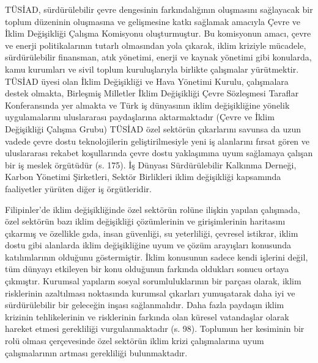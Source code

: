 \documentclass[
]{book}
\begin{document}
TÜSİAD, sürdürülebilir çevre dengesinin farkındalığının oluşmasını sağlayacak bir toplum düzeninin oluşmasına ve gelişmesine katkı sağlamak amacıyla Çevre ve İklim Değişikliği Çalışma Komisyonu oluşturmuştur. Bu komisyonun amacı, çevre ve enerji politikalarının tutarlı olmasından yola çıkarak, iklim kriziyle mücadele, sürdürülebilir finansman, atık yönetimi, enerji ve kaynak yönetimi gibi konularda, kamu kurumları ve sivil toplum kuruluşlarıyla birlikte çalışmalar yürütmektir. TÜSİAD üyesi olan İklim Değişikliği ve Hava Yönetimi Kurulu, çalışmalara destek olmakta, Birleşmiş Milletler İklim Değişikliği Çevre Sözleşmesi Taraflar Konferansında yer almakta ve Türk iş dünyasının iklim değişikliğine yönelik uygulamalarını uluslararası paydaşlarına aktarmaktadır (Çevre ve İklim Değişikliği Çalışma Grubu) TÜSİAD özel sektörün çıkarlarını savunsa da uzun vadede çevre dostu teknolojilerin geliştirilmesiyle yeni iş alanlarını fırsat gören ve uluslararası rekabet koşullarında çevre dostu yaklaşımına uyum sağlamaya çalışan bir iş meslek örgütüdür (s. 175). \citep{sahin2014turkiye} İş Dünyası Sürdürülebilir Kalkınma Derneği, Karbon Yönetimi Şirketleri, Sektör Birlikleri iklim değişikliği kapsamında faaliyetler yürüten diğer iş örgütleridir.

Filipinler'de iklim değişikliğinde özel sektörün rolüne ilişkin yapılan çalışmada, özel sektörün bazı iklim değişikliği çözümlerinin ve girişimlerinin haritasını çıkarmış ve özellikle gıda, insan güvenliği, su yeterliliği, çevresel istikrar, iklim dostu gibi alanlarda iklim değişikliğine uyum ve çözüm arayışları konusunda katılımlarının olduğunu göstermiştir. İklim konusunun sadece kendi işlerini değil, tüm dünyayı etkileyen bir konu olduğunun farkında oldukları sonucu ortaya çıkmıştır. Kurumsal yapıların sosyal sorumluluklarının bir parçası olarak, iklim risklerinin azaltılması noktasında kurumsal çıkarları yumuşatarak daha iyi ve sürdürülebilir bir geleceğin inşası sağlanmalıdır. Daha fazla paydaşın iklim krizinin tehlikelerinin ve risklerinin farkında olan küresel vatandaşlar olarak hareket etmesi gerekliliği vurgulanmaktadır (s. 98). \citep{fe2019philippine} Toplumun her kesiminin bir rolü olması çerçevesinde özel sektörün iklim krizi çalışmalarına uyum çalışmalarının artması gerekliliği bulunmaktadır.
\end{document}
